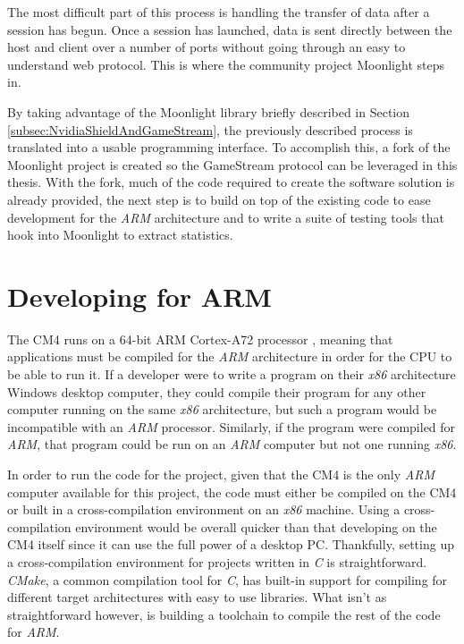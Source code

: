 The most difficult part of this process is handling the transfer of data after a session has begun.
Once a session has launched, data is sent directly between the host and client over a number of ports without going through an easy to understand web protocol.
This is where the community project Moonlight steps in.

By taking advantage of the Moonlight library briefly described in Section \ref{subsec:NvidiaShieldAndGameStream}, the previously described process is translated  into a usable programming interface.
To accomplish this, a fork of the Moonlight project is created so the GameStream protocol can be leveraged in this thesis.
With the fork, much of the code required to create the software solution is already provided, the next step is to build on top of the existing code to ease development for the \emph{ARM} architecture and to write a suite of testing tools that hook into Moonlight to extract statistics.


\section{Developing for ARM}\label{sec:DevelopingForARM}

The CM4 runs on a 64-bit ARM Cortex-A72 processor \cite{rpi_cm4}, meaning that applications must be compiled for the \emph{ARM} architecture in order for the CPU to be able to run it.
If a developer were to write a program on their \emph{x86} architecture Windows desktop computer, they could compile their program for any other computer running on the same \emph{x86} architecture, but such a program would be incompatible with an \emph{ARM} processor.
Similarly, if the program were compiled for \emph{ARM}, that program could be run on an \emph{ARM} computer but not one running \emph{x86}.

In order to run the code for the project, given that the CM4 is the only \emph{ARM} computer available for this project, the code must either be compiled on the CM4 or built in a cross-compilation environment on an \emph{x86} machine.
Using a cross-compilation environment would be overall quicker than that developing on the CM4 itself since it can use the full power of a desktop PC.
Thankfully, setting up a cross-compilation environment for projects written in \emph{C} is straightforward.
\emph{CMake}, a common compilation tool for \emph{C}, has built-in support for compiling for different target architectures with easy to use libraries.
What isn't as straightforward however, is building a toolchain to compile the rest of the code for \emph{ARM}.

